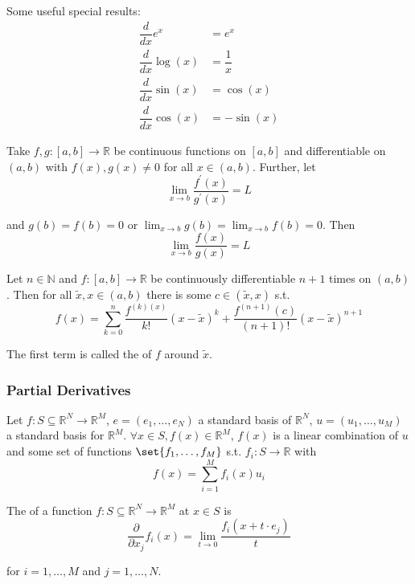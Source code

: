 \documentclass{article}
\begin{document}
Some useful special results:
\begin{align*}
  \dfrac{d}{dx} e^x & = e^x  \\
  \dfrac{d}{dx} \log(x) & = \dfrac{1}{x} \\
  \dfrac{d}{dx} \sin(x) & = \cos(x) \\
  \dfrac{d}{dx} \cos(x) & = -\sin(x)
\end{align*}

\begin{theorem}
  Take $f, g: [a, b] \to \mathbb{R}$ be continuous functions on $[a, b]$ and differentiable on $(a, b)$ with $f(x), g(x) \ne 0$ for all $x \in (a, b)$. Further, let
  \[
    \lim_{x \to b} \dfrac{f^\prime(x)}{g^\prime(x)} = L
  \]

  and $g(b) = f(b) = 0$ or $\lim_{x \to b} g(b) = \lim_{x \to b} f(b) = 0$. Then
  \[
    \lim_{x \to b} \dfrac{f(x)}{g(x)} = L
  \]
\end{theorem}

\begin{theorem}
  Let $n \in \mathbb{N}$ and $f: [a, b] \to \mathbb{R}$ be continuously differentiable $n + 1$ times on $(a, b)$. Then for all $\widetilde{x}, x \in (a, b)$ there is some $c \in (\widetilde{x}, x)$ s.t.
  \[
    f(x)
    = \sum^{n}_{k = 0} \dfrac{f^{(k)(x)}}{k!} (x - \widetilde{x})^k
    + \dfrac{f^{(n + 1)}(c)}{(n + 1)!} (x - \widetilde{x})^{n + 1}
  \]

  The first term is called the  of $f$ around $\widetilde{x}$.
\end{theorem}

\subsubsection{Partial Derivatives}
\label{ssub:partial_derivatives}

\begin{definition}
  Let $f: S \subseteq \mathbb{R}^N \to \mathbb{R}^M$, $e = (e_1, \ldots, e_N)$ a standard basis of $\mathbb{R}^N$, $u = (u_1, \ldots, u_M)$ a standard basis for $\mathbb{R}^M$. $\forall x \in S, f(x) \in \mathbb{R}^M$, $f(x)$ is a linear combination of $u$ and some set of functions $\set{f_1, \ldots, f_M}$ s.t. $f_i: S \to \mathbb{R}$ with
  \[
    f(x) = \sum^{M}_{i = 1} f_i(x) u_i
  \]
\end{definition}

\begin{definition}
  The  of a function $f: S \subseteq \mathbb{R}^N \to \mathbb{R}^M$ at $x \in S$ is
  \[
    \dfrac{\partial}{\partial x_j} f_i(x) = \lim_{t \to 0} \dfrac{f_i(x + t \cdot e_j)}{t}
  \]

  for $i = 1, \ldots, M$ and $j = 1, \ldots, N$.
\end{definition}
\end{document}
